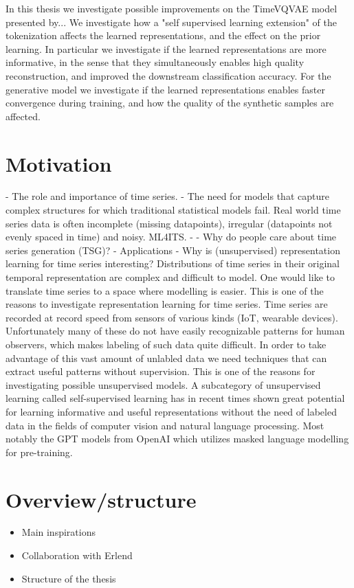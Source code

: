 \documentclass[../../thesis.tex]{subfiles}
\begin{document}
In this thesis we investigate possible improvements on the TimeVQVAE model presented by... We investigate how a "self supervised learning extension" of the tokenization affects the learned representations, and the effect on the prior learning. In particular we investigate if the learned representations are more informative, in the sense that they simultaneously enables high quality reconstruction, and improved the downstream classification accuracy. For the generative model we investigate if the learned representations enables faster convergence during training, and how the quality of the synthetic samples are affected. \\



\section{Motivation}
	- The role and importance of time series.
	- The need for models that capture complex structures for which traditional statistical models fail. 
Real world time series data is often incomplete (missing datapoints), irregular (datapoints not evenly spaced in time) and noisy. 
	ML4ITS. 
	- 
	- Why do people care about time series generation (TSG)?
		- Applications
	- Why is (unsupervised) representation learning for time series interesting?
Distributions of time series in their original temporal representation are complex and difficult to model. One would like to translate time series to a space where modelling is easier. This is one of the reasons to investigate representation learning for time series. Time series are recorded at record speed from sensors of various kinds (IoT, wearable devices). Unfortunately many of these do not have easily recognizable patterns for human observers, which makes labeling of such data quite difficult. In order to take advantage of this vast amount of unlabled data we need techniques that can extract useful patterns without supervision. This is one of the reasons for investigating possible unsupervised models. A subcategory of unsupervised learning called self-supervised learning has in recent times shown great potential for learning informative and useful representations without the need of labeled data in the fields of computer vision and natural language processing. Most notably the GPT models from OpenAI which utilizes masked language modelling for pre-training. 

\section{Overview/structure}
\begin{itemize}
	\item Main inspirations
	\cite{TimeVQVAE} 
	\item Collaboration with Erlend
	\item Structure of the thesis
\end{itemize}
\end{document}

